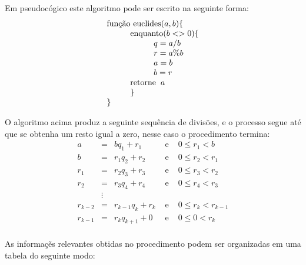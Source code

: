 Em pseudoc\'ogico este algoritmo pode ser escrito na seguinte forma:
\[
\begin{array}{l}
\textmd{fun\c{c}\~ao  euclides} (a, b)\{\\
 \hspace{10mm}	\textrm{enquanto} (b <> 0)\{\\
 \hspace{10mm}	 \hspace{10mm}q = a / b \\
 \hspace{10mm}	 \hspace{10mm}r = a \% b\\
 \hspace{10mm}	 \hspace{10mm}a = b \\
 \hspace{10mm}     \hspace{10mm}b = r \\
 \hspace{10mm}	\textrm{retorne}\hspace{2mm} a\\
 \hspace{10mm} \}\\
\}
\end{array} 
\]

O algoritmo acima produz a seguinte sequ\^{e}ncia de divis\~{o}es, e o processo segue at\'{e}
que se obtenha um resto igual a zero, nesse caso o procedimento termina:
\[
\begin{array}{rclcl}
a   		& =      & bq_{1}+r_{1} 			    & \textrm{ e } & 0\leq r_{1}<b       \\
b   		& =      & r_{1}q_{2}+r_{2} 	    & \textrm{ e } & 0\leq r_{2}<r_{1}       \\
r_{1}		& =      & r_{2}q_{3}+r_{3} 	    & \textrm{ e } & 0\leq r_{3}<r_{2}       \\
r_{2}   & =      & r_{3}q_{4}+r_{4} 	    & \textrm{ e } & 0\leq r_{4}<r_{3}       \\
        & \vdots &     		          	    &              &                     \\
r_{k-2} & =      & r_{k-1}q_{k}+r_{k}     & \textrm{ e } & 0\leq r_{k}<r_{k-1} \\				
r_{k-1} & =      & r_{k}q_{k+1}+ 0        & \textrm{ e } & 0\leq 0    <r_{k} \\		
\end{array}
\]  

As informa\c{c}\~{e}s relevantes obtidas no procedimento podem ser organizadas em uma tabela do seguinte modo:

